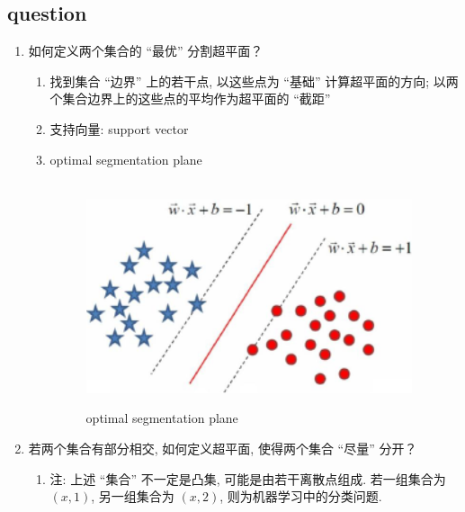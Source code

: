 \documentclass[oneside, 12pt]{ctexbook}
\begin{document}
			\subsection{\quad question}
				\begin{enumerate}
					\item 如何定义两个集合的 “最优” 分割超平面？
						\begin{enumerate}
							\item 找到集合 “边界” 上的若干点, 以这些点为 “基础” 计算超平面的方向; 以两个集合边界上的这些点的平均作为超平面的 “截距”
							
							\item 支持向量: support vector
							
							\item optimal segmentation plane
								\begin{figure}[H]
									\vspace{-0.2cm}  %
									\setlength{\abovecaptionskip}{-0.2cm}   %
									\centering
									\includegraphics[scale=0.6]{optimal_segmentation_plane.png}
									\renewcommand{\figurename}{Fig} %
									\caption{optimal segmentation plane}
									\label{fig:6}
								\end{figure}
						\end{enumerate}
					
					\item 若两个集合有部分相交, 如何定义超平面, 使得两个集合 “尽量” 分开？
						\begin{enumerate}
							\item 注: 上述 “集合” 不一定是凸集, 可能是由若干离散点组成. 若一组集合为 $(x, 1)$, 另一组集合为 $(x, 2)$, 则为机器学习中的分类问题.
						\end{enumerate}
				\end{enumerate}
			
\end{document}
